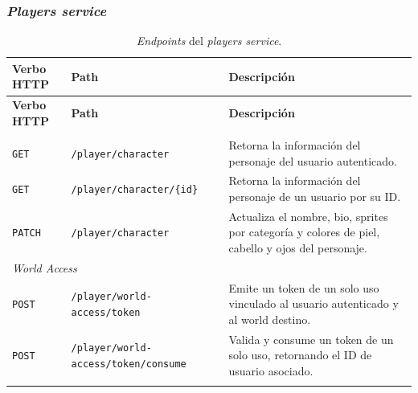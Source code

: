 \subsubsection{\textit{Players service}}

\renewcommand{\arraystretch}{1.4}
\begin{longtable}{|p{2cm}|p{7cm}|p{5.5cm}|}
\hline
\textbf{Verbo HTTP} & \textbf{Path} & \textbf{Descripción} \\
\hline
\endfirsthead

\hline
\textbf{Verbo HTTP} & \textbf{Path} & \textbf{Descripción} \\
\hline
\endhead

\endfoot

\multicolumn{3}{|l|}{\textit{Character}} \\
\hline
\texttt{GET}   & \texttt{/player/character}            & Retorna la información del personaje del usuario autenticado. \\
\hline
\texttt{GET}   & \texttt{/player/character/\{id\}}     & Retorna la información del personaje de un usuario por su ID. \\
\hline
\texttt{PATCH} & \texttt{/player/character}            & Actualiza el nombre, bio, sprites por categoría y colores de piel, cabello y ojos del personaje. \\
\hline
\multicolumn{3}{|l|}{\textit{World Access}} \\
\hline
\texttt{POST}  & \texttt{/player/world-access/token}         & Emite un token de un solo uso vinculado al usuario autenticado y al world destino. \\
\hline
\texttt{POST}  & \texttt{/player/world-access/token/consume} & Valida y consume un token de un solo uso, retornando el ID de usuario asociado. \\
\hline
\caption{\textit{Endpoints} del \textit{players service}.}\label{tab:players-endpoints}
\end{longtable}
